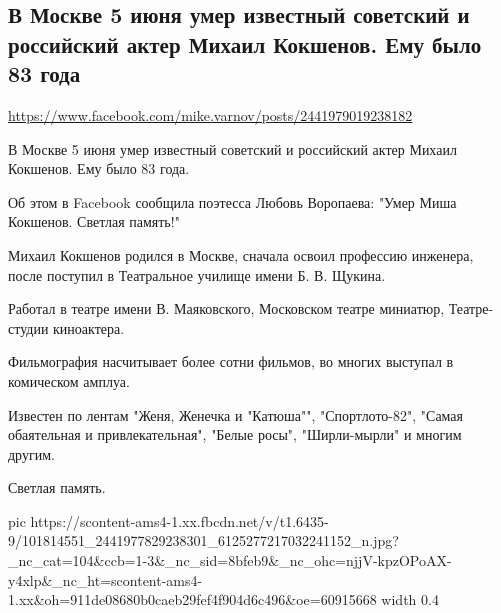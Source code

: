  
 
 
 
 

\subsection{В Москве 5 июня умер известный советский и российский актер Михаил Кокшенов. Ему было 83 года}
\url{https://www.facebook.com/mike.varnov/posts/2441979019238182}

В Москве 5 июня умер известный советский и российский актер Михаил Кокшенов. Ему было 83 года. 

Об этом в Facebook сообщила поэтесса Любовь Воропаева: "Умер Миша Кокшенов. Светлая память!"

Михаил Кокшенов родился в Москве, сначала освоил профессию инженера, после поступил в Театральное училище имени Б. В. Щукина. 

Работал в театре имени В. Маяковского, Московском театре миниатюр, Театре-студии киноактера.

Фильмография насчитывает более сотни фильмов, во многих выступал в комическом амплуа. 

Известен по лентам "Женя, Женечка и "Катюша"", "Спортлото-82", "Самая обаятельная и привлекательная", "Белые росы", "Ширли-мырли" и многим другим.

Светлая память.


\ifcmt
  pic https://scontent-ams4-1.xx.fbcdn.net/v/t1.6435-9/101814551_2441977829238301_6125277217032241152_n.jpg?_nc_cat=104&ccb=1-3&_nc_sid=8bfeb9&_nc_ohc=njjV-kpzOPoAX-y4xlp&_nc_ht=scontent-ams4-1.xx&oh=911de08680b0caeb29fef4f904d6c496&oe=60915668
  width 0.4
\fi

